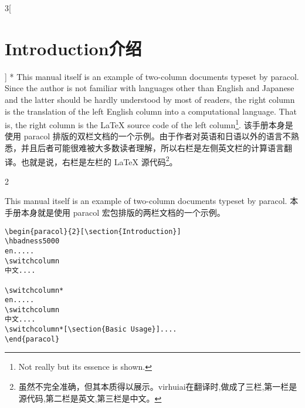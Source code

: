 \begin{paracol}{3}[\section{Introduction\hfill 介绍}]
\switchcolumn[1]*
This manual itself is an example of two-column documents typeset by
\textsf{paracol}.  Since the author is not familiar with languages other
than English and Japanese and the latter should be hardly understood by
most of readers, the right column is the translation of the left English
column into a computational language.  That is, the right column is the
\LaTeX{} source code of the left column\footnote{%
Not really but its essence
is shown.\label{fn:first}}.
\switchcolumn
该手册本身是使用 \textsf{paracol} 排版的双栏文档的一个示例。由于作者对英语和日语以外的语言不熟悉，并且后者可能很难被大多数读者理解，所以右栏是左侧英文栏的计算语言翻译。也就是说，右栏是左栏的 \LaTeX{} 源代码\footnote{%
虽然不完全准确，但其本质得以展示。\label{fn:first}virhuiai在翻译时,做成了三栏,第一栏是源代码,第二栏是英文,第三栏是中文。}。
\end{paracol}




\begin{paracol}{2}

\switchcolumn



\switchcolumn*
This manual itself is an example of two-column documents typeset by
\textsf{paracol}.  
\switchcolumn
本手册本身就是使用 \textsf{paracol} 宏包排版的两栏文档的一个示例。

\end{paracol}
\begin{Verbatim}
\begin{paracol}{2}[\section{Introduction}]
\hbadness5000
en.....
\switchcolumn
中文....

\switchcolumn*
en.....
\switchcolumn
中文....
\switchcolumn*[\section{Basic Usage}]....
\end{paracol}
\end{Verbatim}